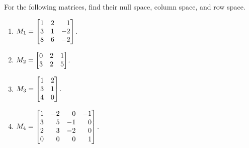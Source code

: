 
\begin{exercises}

	\begin{problist}
		\prob For the following matrices, find their null space, column space, and
		row space.
		\begin{enumerate}
			\item $M_{1}=\mat{1&2&1\\3&1&-2\\8&6&-2}$.

			\item $M_{2}=\mat{0&2&1\\3&2&5}$.

			\item $M_{3}=\mat{1&2\\3&1\\4&0}$.

			\item $M_{4}=\mat{1&-2&0&-1\\3&5&-1&0\\2&3&-2&0\\0&0&0&1}$.
		\end{enumerate}


		\begin{solution}


\end{solution}
\end{problist}
\end{exercises}

